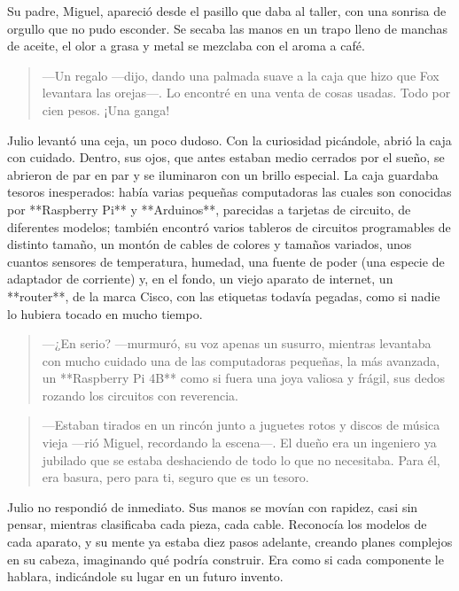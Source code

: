 \documentclass[a4paper,12pt]{book}
\begin{document}
Su padre, Miguel, apareció desde el pasillo que daba al taller, con una sonrisa de orgullo que no pudo esconder. Se secaba las manos en un trapo lleno de manchas de aceite, el olor a grasa y metal se mezclaba con el aroma a café.

\begin{quote}
    —Un regalo —dijo, dando una palmada suave a la caja que hizo que Fox levantara las orejas—. Lo encontré en una venta de cosas usadas. Todo por cien pesos. ¡Una ganga!
\end{quote}

Julio levantó una ceja, un poco dudoso. Con la curiosidad picándole, abrió la caja con cuidado. Dentro, sus ojos, que antes estaban medio cerrados por el sueño, se abrieron de par en par y se iluminaron con un brillo especial. La caja guardaba tesoros inesperados: había varias pequeñas computadoras las cuales son conocidas por **Raspberry Pi** y **Arduinos**, parecidas a tarjetas de circuito, de diferentes modelos; también encontró varios tableros de circuitos programables de distinto tamaño, un montón de cables de colores y tamaños variados, unos cuantos sensores de temperatura, humedad, una fuente de poder (una especie de adaptador de corriente) y, en el fondo, un viejo aparato de internet, un **router**, de la marca Cisco, con las etiquetas todavía pegadas, como si nadie lo hubiera tocado en mucho tiempo.

\begin{quote}
    —¿En serio? —murmuró, su voz apenas un susurro, mientras levantaba con mucho cuidado una de las computadoras pequeñas, la más avanzada, un **Raspberry Pi 4B** como si fuera una joya valiosa y frágil, sus dedos rozando los circuitos con reverencia.
\end{quote}

\begin{quote}
    —Estaban tirados en un rincón junto a juguetes rotos y discos de música vieja —rió Miguel, recordando la escena—. El dueño era un ingeniero ya jubilado que se estaba deshaciendo de todo lo que no necesitaba. Para él, era basura, pero para ti, seguro que es un tesoro.
\end{quote}

Julio no respondió de inmediato. Sus manos se movían con rapidez, casi sin pensar, mientras clasificaba cada pieza, cada cable. Reconocía los modelos de cada aparato, y su mente ya estaba diez pasos adelante, creando planes complejos en su cabeza, imaginando qué podría construir. Era como si cada componente le hablara, indicándole su lugar en un futuro invento.
\end{document}
